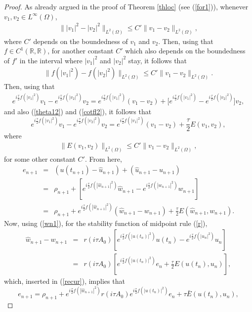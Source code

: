 \documentclass[a4paper,12pt]{article}
\begin{document}
\begin{proof}
As already argued in the proof of Theorem \ref{thloc} (see (\ref{for1})), whenever $v_1,v_2 \in L^\infty(\Omega)$,
\begin{eqnarray}
\||v_1|^2-|v_2|^2\|_{L^2(\Omega)}\le C' \|v_1-v_2\|_{L^2(\Omega)},
\nonumber
\end{eqnarray}
where $C'$ depends on the boundedness of $v_1$ and $v_2$. Then, using that $f\in C^1(\mathbb{R},\mathbb{R})$, for another constant $C'$ which also depends on the boundedness of $f'$ in the interval where $|v_1|^2$ and $|v_2|^2$ stay, it follows that
\begin{eqnarray}
\|f(|v_1|^2)-f(|v_2|^2)\|_{L^2(\Omega)}\le C' \|v_1-v_2\|_{L^2(\Omega)}.
\label{cotfl2}
\end{eqnarray}
Then, using that
\begin{eqnarray}
e^{i \frac{\tau}{2}f(|v_1|^2)}v_1-e^{i \frac{\tau}{2}f(|v_2|^2)}v_2= e^{i \frac{\tau}{2}f(|v_1|^2)}(v_1-v_2)+\big[ e^{i \frac{\tau}{2}f(|v_1|^2)}-e^{i \frac{\tau}{2}f(|v_2|^2)}\big]v_2,
\nonumber
\end{eqnarray}
and also (\ref{theta12}) and (\ref{cotfl2}), it follows that
$$e^{i \frac{\tau}{2}f(|v_1|^2)}v_1-e^{i \frac{\tau}{2}f(|v_2|^2)}v_2= e^{i \frac{\tau}{2}f(|v_1|^2)}(v_1-v_2)+\frac{\tau}{2}E(v_1,v_2),$$
where
\begin{eqnarray}
\|E(v_1,v_2)\|_{L^2(\Omega)} \le C' \|v_1-v_2\|_{L^2(\Omega)},
\label{acotE}
\end{eqnarray}
for some other constant $C'$. From here,
\begin{eqnarray}
e_{n+1}&=&(u(t_{n+1})-\hat{u}_{n+1})+(\hat{u}_{n+1}-u_{n+1})
\nonumber \\
&=&\rho_{n+1}+[e^{i \frac{\tau}{2}f(|\hat{w}_{n+1}|^2)}\hat{w}_{n+1}-e^{i \frac{\tau}{2}f(|w_{n+1}|^2)}w_{n+1}] \nonumber \\
&=& \rho_{n+1}+e^{i \frac{\tau}{2}f(|\hat{w}_{n+1}|^2)}(\hat{w}_{n+1}-w_{n+1})+\frac{\tau}{2} E(\hat{w}_{n+1},w_{n+1}). \label{recur}
\end{eqnarray}
Now, using (\ref{wn1}), for the stability function of midpoint rule (\ref{r}),
\begin{eqnarray}
\hat{w}_{n+1}-w_{n+1}&=&r(i \tau A_0)[e^{i \frac{\tau}{2}f(|u(t_n)|^2)}u(t_n)-e^{i \frac{\tau}{2}f(|u_n|^2)}u_n] \nonumber \\
&=&r(i \tau A_0)[e^{i \frac{\tau}{2}f(|u(t_n)|^2)} e_n+\frac{\tau}{2} E(u(t_n), u_n)], \nonumber
\end{eqnarray}
which, inserted in (\ref{recur}), implies that
$$
e_{n+1}=\rho_{n+1}+e^{i \frac{\tau}{2}f(|\hat{w}_{n+1}|^2)} r(i \tau A_0) e^{i \frac{\tau}{2}f(|u(t_n)|^2)}e_n+\tau \bar{E}(u(t_n), u_n),$$

\end{proof}
\end{document}
